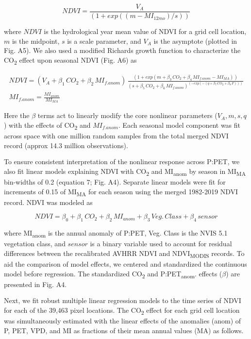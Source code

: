 \documentclass[gc, manuscript]{copernicus}
\begin{document}
\begin{equation}
NDVI = \frac{V_A}{(1+exp((m-MI_{12mo})/s))}
\end{equation}

where \(NDVI\) is the hydrological year mean value of NDVI for a grid
cell location, \(m\) is the midpoint, \(s\) is a scale parameter, and
\(V_A\) is the asymptote (plotted in Fig. A5). We also used a modified
Richards growth function to characterize the CO\textsubscript{2} effect
upon seasonal NDVI (Fig. A6) as

\begin{align}
NDVI=(V_A+\beta_1\,CO_2+\beta_2\,MI_{f.anom})\,\frac{(1+exp(m+\beta_3\,CO_2+\beta_4\,MI_{f.anom} - MI_{MA}))}{(s+\beta_5\,CO_2+\beta_6\,MI_{f.anom})^{(-exp(-(q+\beta_7\,CO_2+\beta_8\,F)))}}\\
MI_{f.anom} = \frac{MI_{anom}}{MI_{MA}}\nonumber
\end{align}

Here the \(\beta\) terms act to linearly modify the core nonlinear
parameters (\(V_A, m, s, q\)) with the effects of CO\textsubscript{2}
and \(MI_{f.anom}\). Each seasonal model component was fit across space
with one million random samples from the total merged NDVI record
(approx 14.3 million observations).

To ensure consistent interpretation of the nonlinear response across
P:PET, we also fit linear models explaining NDVI with
CO\textsubscript{2} and MI\textsubscript{anom} by season in
MI\textsubscript{MA} bin-widths of 0.2 (equation 7; Fig. A4). Separate
linear models were fit for increments of 0.15 of MI\textsubscript{MA}
for each season using the merged 1982-2019 NDVI record. NDVI was modeled
as

\begin{equation}
NDVI = \beta_0+\beta_1\,CO_2 + \beta_2\,MI_{anom}+\beta_3\,Veg.\,Class+\beta_4\,sensor
\end{equation}

where MI\textsubscript{anom} is the annual anomaly of P:PET, Veg. Class
is the NVIS 5.1 vegetation class, and \(sensor\) is a binary variable
used to account for residual differences between the recalibrated AVHRR
NDVI and NDVI\textsubscript{MODIS} records. To aid the comparison of
model effects, we centered and standardized the continuous model before
regression. The standardized CO\textsubscript{2} and
P:PET\textsubscript{anom}. effects (\(\beta\)) are presented in Fig. A4.

Next, we fit robust multiple linear regression models to the time series
of NDVI for each of the 39,463 pixel locations. The CO\textsubscript{2}
effect for each grid cell location was simultaneously estimated with the
linear effects of the anomalies (anom) of P, PET, VPD, and MI as
fractions of their mean annual values (MA) as follows.
\end{document}
